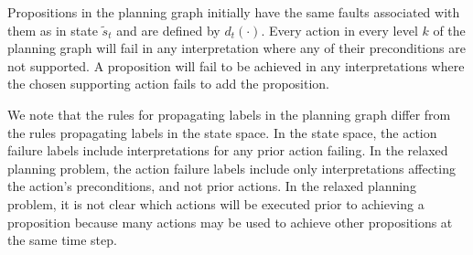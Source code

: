 \documentclass{article}
\begin{document}
\noindent Propositions in the planning graph initially have the same faults associated with them as in state $\tilde{s}_t$ and are defined by $d_t(\cdot)$.  Every action in every level $k$ of the planning graph will fail in any interpretation where any of their preconditions are not supported.  A proposition will fail to be achieved in any interpretations where the chosen supporting action fails to add the proposition.

We note that the rules for propagating labels in the planning graph differ from the rules propagating labels in the state space.  In the state space, the action failure labels include interpretations for any prior action failing.  In the relaxed planning problem, the action failure labels include only interpretations affecting the action's preconditions, and not prior actions.  In the relaxed planning problem, it is not clear which actions will be executed prior to achieving a proposition because many actions may be used to achieve other propositions at the same time step.  
\end{document}
